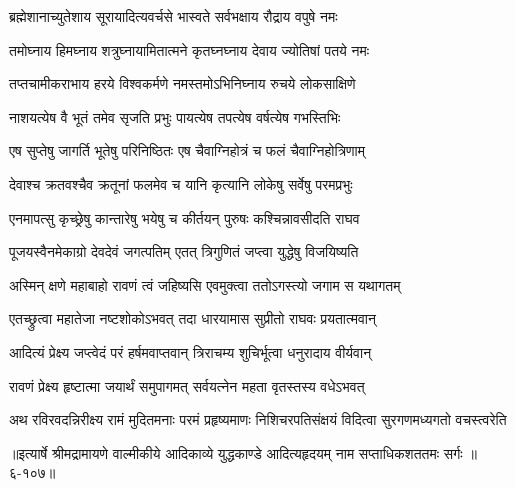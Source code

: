 \twolineshloka
{ब्रह्मेशानाच्युतेशाय सूरायादित्यवर्चसे}
{भास्वते सर्वभक्षाय रौद्राय वपुषे नमः} %

\twolineshloka
{तमोघ्नाय हिमघ्नाय शत्रुघ्नायामितात्मने}
{कृतघ्नघ्नाय देवाय ज्योतिषां पतये नमः} %

\twolineshloka
{तप्तचामीकराभाय हरये विश्वकर्मणे}
{नमस्तमोऽभिनिघ्नाय रुचये लोकसाक्षिणे} %

\twolineshloka
{नाशयत्येष वै भूतं तमेव सृजति प्रभुः}
{पायत्येष तपत्येष वर्षत्येष गभस्तिभिः} %

\twolineshloka
{एष सुप्तेषु जागर्ति भूतेषु परिनिष्ठितः}
{एष चैवाग्निहोत्रं च फलं चैवाग्निहोत्रिणाम्} %

\twolineshloka
{देवाश्च क्रतवश्चैव क्रतूनां फलमेव च}
{यानि कृत्यानि लोकेषु सर्वेषु परमप्रभुः} %

\twolineshloka
{एनमापत्सु कृच्छ्रेषु कान्तारेषु भयेषु च}
{कीर्तयन् पुरुषः कश्चिन्नावसीदति राघव} %

\twolineshloka
{पूजयस्वैनमेकाग्रो देवदेवं जगत्पतिम्}
{एतत् त्रिगुणितं जप्त्वा युद्धेषु विजयिष्यति} %

\twolineshloka
{अस्मिन् क्षणे महाबाहो रावणं त्वं जहिष्यसि}
{एवमुक्त्वा ततोऽगस्त्यो जगाम स यथागतम्} %

\twolineshloka
{एतच्छ्रुत्वा महातेजा नष्टशोकोऽभवत् तदा}
{धारयामास सुप्रीतो राघवः प्रयतात्मवान्} %

\twolineshloka
{आदित्यं प्रेक्ष्य जप्त्वेदं परं हर्षमवाप्तवान्}
{त्रिराचम्य शुचिर्भूत्वा धनुरादाय वीर्यवान्} %

\twolineshloka
{रावणं प्रेक्ष्य हृष्टात्मा जयार्थं समुपागमत्}
{सर्वयत्नेन महता वृतस्तस्य वधेऽभवत्} %

\twolineshloka
{अथ रविरवदन्निरीक्ष्य रामं मुदितमनाः परमं प्रहृष्यमाणः}
{निशिचरपतिसंक्षयं विदित्वा सुरगणमध्यगतो वचस्त्वरेति} %


॥इत्यार्षे श्रीमद्रामायणे वाल्मीकीये आदिकाव्ये युद्धकाण्डे आदित्यहृदयम् नाम सप्ताधिकशततमः सर्गः ॥६-१०७॥
